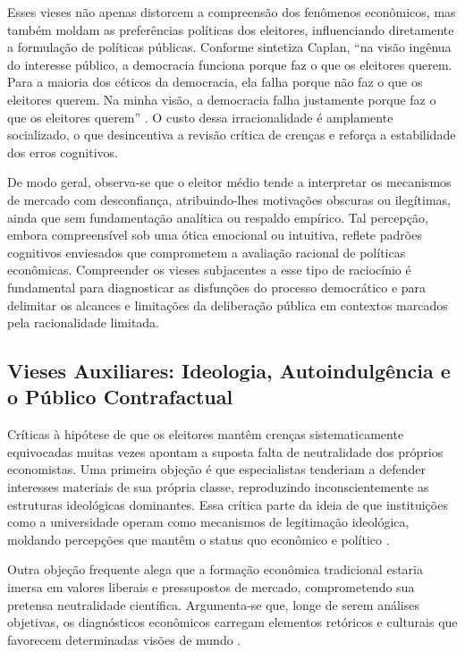 Esses vieses não apenas distorcem a compreensão dos fenômenos econômicos, mas também moldam as preferências políticas dos eleitores, influenciando diretamente a formulação de políticas públicas. Conforme sintetiza Caplan, ``na visão ingênua do interesse público, a democracia funciona porque faz o que os eleitores querem. Para a maioria dos céticos da democracia, ela falha porque não faz o que os eleitores querem. Na minha visão, a democracia falha justamente porque faz o que os eleitores querem'' \cite[p.~3]{The_Myth_of_the_Rational_Voter}. O custo dessa irracionalidade é amplamente socializado, o que desincentiva a revisão crítica de crenças e reforça a estabilidade dos erros cognitivos.

De modo geral, observa-se que o eleitor médio tende a interpretar os mecanismos de mercado com desconfiança, atribuindo-lhes motivações obscuras ou ilegítimas, ainda que sem fundamentação analítica ou respaldo empírico. Tal percepção, embora compreensível sob uma ótica emocional ou intuitiva, reflete padrões cognitivos enviesados que comprometem a avaliação racional de políticas econômicas. Compreender os vieses subjacentes a esse tipo de raciocínio é fundamental para diagnosticar as disfunções do processo democrático e para delimitar os alcances e limitações da deliberação pública em contextos marcados pela racionalidade limitada.

\subsection{Vieses Auxiliares: Ideologia, Autoindulgência e o Público Contrafactual}
\label{sec:vieses_auxiliares}

Críticas à hipótese de que os eleitores mantêm crenças sistematicamente equivocadas muitas vezes apontam a suposta falta de neutralidade dos próprios economistas. Uma primeira objeção é que especialistas tenderiam a defender interesses materiais de sua própria classe, reproduzindo inconscientemente as estruturas ideológicas dominantes. Essa crítica parte da ideia de que instituições como a universidade operam como mecanismos de legitimação ideológica, moldando percepções que mantêm o status quo econômico e político \cite{althusser1971ideology, The_Myth_of_the_Rational_Voter}.

Outra objeção frequente alega que a formação econômica tradicional estaria imersa em valores liberais e pressupostos de mercado, comprometendo sua pretensa neutralidade científica. Argumenta-se que, longe de serem análises objetivas, os diagnósticos econômicos carregam elementos retóricos e culturais que favorecem determinadas visões de mundo \cite{mccloskey1998rhetoric, The_Myth_of_the_Rational_Voter}.

